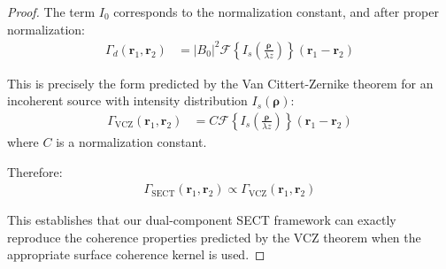 \documentclass[10pt,a4paper]{amsart}
\begin{document}
\begin{proof}
The term $I_0$ corresponds to the normalization constant, and after proper normalization:
\begin{align}
\Gamma_d(\mathbf{r}_1, \mathbf{r}_2) &= |B_0|^2 \mathcal{F}\left\{I_s\left(\frac{\mathbf{\rho}}{\lambda z}\right)\right\}(\mathbf{r}_1-\mathbf{r}_2)
\end{align}

This is precisely the form predicted by the Van Cittert-Zernike theorem for an incoherent source with intensity distribution $I_s(\mathbf{\rho})$:
\begin{align}
\Gamma_{\text{VCZ}}(\mathbf{r}_1, \mathbf{r}_2) &= C \mathcal{F}\left\{I_s\left(\frac{\mathbf{\rho}}{\lambda z}\right)\right\}(\mathbf{r}_1-\mathbf{r}_2)
\end{align}
where $C$ is a normalization constant.

Therefore:
\begin{align}
\Gamma_{\text{SECT}}(\mathbf{r}_1, \mathbf{r}_2) \propto \Gamma_{\text{VCZ}}(\mathbf{r}_1, \mathbf{r}_2)
\end{align}

This establishes that our dual-component SECT framework can exactly reproduce the coherence properties predicted by the VCZ theorem when the appropriate surface coherence kernel is used.
\end{proof}
\end{document}

